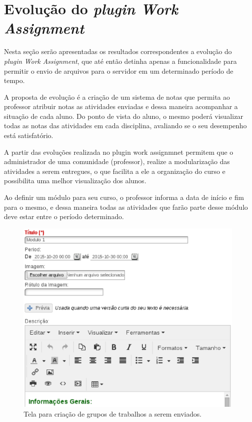\section{Evolução do \textit{plugin Work Assignment}}

Nesta seção serão apresentadas os resultados correspondentes a evolução do \textit{plugin Work Assignment}, que até então detinha apenas a funcionalidade para permitir o envio de arquivos para o servidor em um determinado período de tempo.

A proposta de evolução é a criação de um sistema de notas que permita ao professor atribuir notas as atividades enviadas e dessa maneira acompanhar a situação de cada aluno. Do ponto de vista do aluno, o mesmo poderá visualizar todas as notas das atividades em cada disciplina, avaliando se o seu desempenho está satisfatório.

A partir das evoluções realizada no plugin work assignmnet permitem que o administrador de uma comunidade (professor), realize a modularização das atividades a serem entregues, o que facilita a ele a organização do curso e possibilita uma melhor visualização dos alunos.

Ao definir um módulo para seu curso, o professor informa a data de início e fim para o mesmo, e dessa maneira todas as atividades que farão parte desse módulo deve estar entre o período determinado.

\begin{figure}[h]
    \centering
    \includegraphics[keepaspectratio=true,scale=0.6]
      {figuras/work-assignment-group.eps}
    \caption{Tela para criação de grupos de trabalhos a serem enviados.}
    \label{fig:work-assignment-group}
\end{figure}

